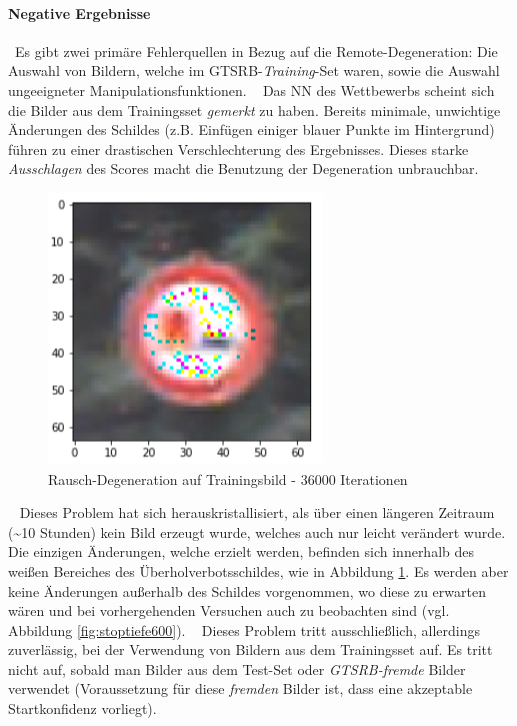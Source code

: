 \paragraph{Negative Ergebnisse} ~\newline Es gibt zwei primäre Fehlerquellen in Bezug auf die Remote-Degeneration: 
Die Auswahl von Bildern, welche im GTSRB-\textit{Training}-Set waren, sowie die Auswahl ungeeigneter Manipulationsfunktionen. 
~\newline
Das \ac{NN} des Wettbewerbs scheint sich die Bilder aus dem Trainingsset \textit{gemerkt} zu haben. 
Bereits minimale, unwichtige Änderungen des Schildes (z.B. Einfügen einiger blauer Punkte im Hintergrund) führen zu einer drastischen Verschlechterung des Ergebnisses. 
Dieses starke \textit{Ausschlagen} des Scores macht die Benutzung der Degeneration unbrauchbar.
\begin{figure}[h]
	\centering
	\includegraphics[width=0.5\linewidth]{Images/DegenSamples/OverFitSmaller}
	\caption[Degeneration overfit]{Rausch-Degeneration auf Trainingsbild - 36000 Iterationen}
	\label{fig:DegenOverfit}
\end{figure}
~\newline
Dieses Problem hat sich herauskristallisiert, als über einen längeren Zeitraum (\textasciitilde  10 Stunden) kein Bild erzeugt wurde, welches auch nur leicht verändert wurde. 
Die einzigen Änderungen, welche erzielt werden, befinden sich innerhalb des weißen Bereiches des Überholverbotsschildes, wie in Abbildung \ref{fig:DegenOverfit}. 
Es werden aber keine Änderungen außerhalb des Schildes vorgenommen, wo diese zu erwarten wären und bei vorhergehenden Versuchen auch zu beobachten sind (vgl. Abbildung \ref{fig:stoptiefe600}). 
~\newline
Dieses Problem tritt ausschließlich, allerdings zuverlässig, bei der Verwendung von Bildern aus dem Trainingsset auf. 
Es tritt nicht auf, sobald man Bilder aus dem Test-Set oder \textit{GTSRB-fremde} Bilder verwendet (Voraussetzung für diese \textit{fremden} Bilder ist, dass eine akzeptable Startkonfidenz vorliegt). 

